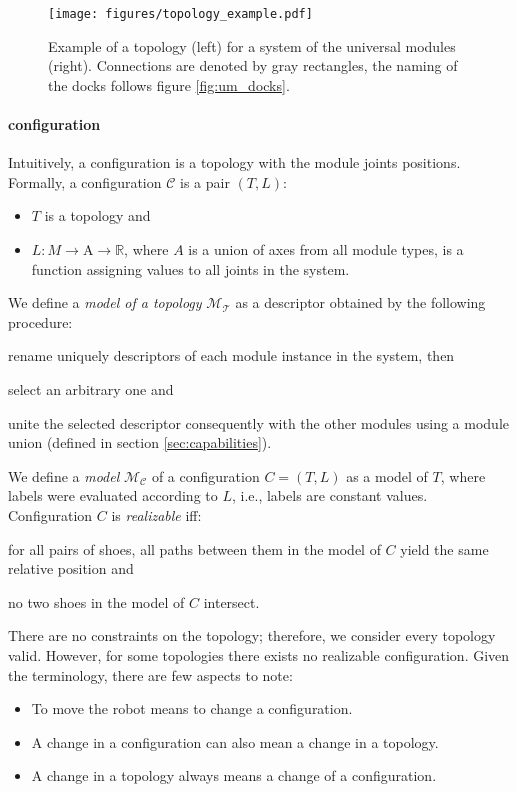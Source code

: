\begin{figure}[t]
    \centering
    \texttt{[image: figures/topology\_example.pdf]}
    \caption{Example of a topology (left) for a system of the universal modules
    (right). Connections are denoted by gray rectangles, the naming of the docks
    follows figure \ref{fig:um_docks}. }
    \label{fig:topology_example}
\end{figure}

\paragraph{configuration} Intuitively, a configuration is a topology with the
 module joints positions. Formally, a configuration $\mathcal{C}$ is a pair $(T,
 L)$:
 \begin{itemize}
    \item $T$ is a topology and
    \item $L: M \rightarrow \text{A} \rightarrow \mathds{R}$, where $A$ is a
    union of axes from all module types, is a function assigning values to all
    joints in the system.
 \end{itemize}

We define a \emph{model of a topology} $\mathcal{M}_\mathcal{T}$ as a descriptor
obtained by the following procedure:
\begin{enumerate*}
    \item rename uniquely descriptors of each module instance in the system, then
    \item select an arbitrary one and
    \item unite the selected descriptor consequently with the other modules
    using a module union (defined in section \ref{sec:capabilities}).
\end{enumerate*}
We define a \emph{model} $\mathcal{M}_\mathcal{C}$ of a configuration
$C=(T, L)$ as a model of $T$, where labels were evaluated according to $L$,
i.e., labels are constant values. Configuration $C$ is \emph{realizable} iff:
\begin{enumerate*}
    \item for all pairs of shoes, all paths between them in the model of $C$
    yield the same relative position and
    \item no two shoes in the model of $C$ intersect.
\end{enumerate*}

There are no constraints on the topology; therefore, we consider every topology
valid. However, for some topologies there exists no realizable configuration.
Given the terminology, there are few aspects to note:
\begin{itemize}
    \item To move the robot means to change a configuration.
    \item A change in a configuration can also mean a change in a topology.
    \item A change in a topology always means a change of a configuration.
\end{itemize}

